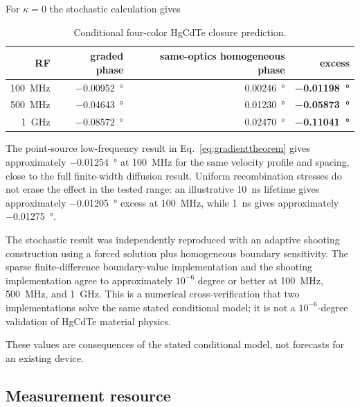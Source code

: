 \documentclass[11pt]{article}
\begin{document}
For $\kappa=0$ the stochastic calculation gives
\begin{table}[H]
\centering
\caption{Conditional four-color HgCdTe closure prediction.}
\begin{tabular}{rrrr}
\toprule
RF & graded phase & same-optics homogeneous phase & excess \\
\midrule
\SI{100}{MHz} & \SI{-0.00952}{\degree} & \SI{+0.00246}{\degree} & \textbf{\SI{-0.01198}{\degree}} \\
\SI{500}{MHz} & \SI{-0.04643}{\degree} & \SI{+0.01230}{\degree} & \textbf{\SI{-0.05873}{\degree}} \\
\SI{1}{GHz} & \SI{-0.08572}{\degree} & \SI{+0.02470}{\degree} & \textbf{\SI{-0.11041}{\degree}} \\
\bottomrule
\end{tabular}
\label{tab:hgclosure}
\end{table}

The point-source low-frequency result in Eq.~\eqref{eq:gradienttheorem} gives approximately \SI{-0.01254}{\degree} at \SI{100}{MHz} for the same velocity profile and spacing, close to the full finite-width diffusion result. Uniform recombination stresses do not erase the effect in the tested range: an illustrative \SI{10}{ns} lifetime gives approximately \SI{-0.01205}{\degree} excess at \SI{100}{MHz}, while \SI{1}{ns} gives approximately \SI{-0.01275}{\degree}.

The stochastic result was independently reproduced with an adaptive shooting construction using a forced solution plus homogeneous boundary sensitivity. The sparse finite-difference boundary-value implementation and the shooting implementation agree to approximately $10^{-6}$ degree or better at \SI{100}{MHz}, \SI{500}{MHz}, and \SI{1}{GHz}. This is a numerical cross-verification that two implementations solve the same stated conditional model; it is not a $10^{-6}$-degree validation of HgCdTe material physics.

These values are consequences of the stated conditional model, not forecasts for an existing device.

\subsection{Measurement resource}
\end{document}
